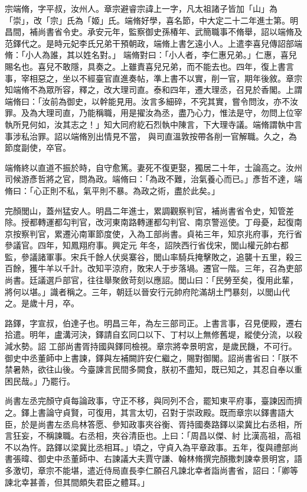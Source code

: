 \begin{pinyinscope}
 宗端脩，字平叔，汝州人。章宗避睿宗諱上一字，凡太祖諸子皆加「山」為「崇」，改「宗」氏為「姬」氏。端脩好學，喜名節，中大定二十二年進士第。明昌間，補尚書省令史。承安元年，監察御史孫椿年、武簡職事不脩舉，詔以端脩及范鐸代之。是時元妃李氏兄弟干預朝政，端脩上書乞遠小人。上遣李喜兒傳詔部端脩：「小人為誰，其以姓名對。」
 端脩對曰：「小人者，李仁惠兄弟。」仁惠，喜兒賜名也。喜兒不敢隱，具奏之。上雖責喜兒兄弟，而不能去也。四年，復上書言事，宰相惡之，坐以不經臺官直進奏帖，準上書不以實，削一官，期年後敘。章宗知端脩不為眾所容，釋之，改大理司直。泰和四年，遷大理丞，召見於香閣。上謂端脩曰：「汝前為御史，以幹能見用。汝言多細碎，不究其實，嘗令問汝，亦不汝罪。及為大理司直，乃能稱職，用是擢汝為丞，盡乃心力，惟法是守，勿問上位宰執所見何如，汝其志之！」知大同府紇石烈執中陳言，下大理寺議。端脩謂執中言事涉私治罪。詔以端脩別出情見不當，
 與司直溫敦按帶各削一官解職。久之，為節度副使，卒官。



 端脩終以直道不振於時，自守愈篤。妻死不復更娶，獨居二十年，士論高之。汝州司候游彥哲將之官，問為政。端脩曰：「為政不難，治氣養心而已。」彥哲不達，端脩曰：「心正則不私，氣平則不暴。為政之術，盡於此矣。」



 完顏閭山，蓋州猛安人。明昌二年進士，累調觀察判官，補尚書省令史，知管差除。授都轉運都勾判官，改河東南路轉運都勾判官、南京警巡使。丁母憂，起復南京按察判官，累遷沁南軍節度使，入為工部尚書。貞祐三年，知京兆府事，充行省參議官。四年，知鳳翔府事。興定元
 年冬，詔陜西行省伐宋，閭山權元帥右都監，參議諸軍事。宋兵千餘人伏吳寨谷，閭山率騎兵掩擊敗之，追襲十五里，殺三百餘，獲牛羊以千計。改知平涼府，敗宋人于步落堝。遷官一階。三年，召為吏部尚書。廷議選戶部官，往往舉聚斂苛刻以應詔。閭山曰：「民勞至矣，復用此輩，將何以堪。」識者稱之。三年，朝廷以晉安行元帥府陀滿胡土門暴刻，以閭山代之。是歲十月，卒。



 路鐸，字宣叔，伯達子也。明昌三年，為左三部司正。上書言事，召見便殿，遷右拾遣。明年，盧溝河決，鐸請自玄同口以下、丁村以上無修舊堤，縱使分流，以殺減水勢。詔
 工部尚書胥持國與鐸同檢視。章宗將幸景明宮，是歲民饑，不可行。御史中丞董師中上書諫，鐸與左補闕許安仁繼之，賜對御閣。詔尚書省曰：「朕不禁暑熱，欲往山後。今臺諫言民間多闕食，朕初不盡知，既已知之，其忍自奉以重困民哉。」乃罷行。



 尚書左丞完顏守貞每論政事，守正不移，與同列不合，罷知東平府事，臺諫因而擠之。鐸上書論守貞賢，可復用，其言太切，召對于崇政殿。既而章宗以鐸書語大臣，於是尚書左丞烏林答愿、參知政事夾谷衡、胥持國奏路鐸以梁冀比右丞相，所言狂妄，不稱諫職。右丞相，夾谷清臣也。上曰：「周昌以傑、紂
 比漢高祖，高祖不以為忤。路鐸以梁冀比丞相耳。」頃之，守貞入為平章政事。五年，復與禮部尚書張暐、御史中丞董師中、右諫議大夫賈守謙、翰林脩撰完顏撒刺諫幸景明宮，語多激切，章宗不能堪，遣近侍局直長李仁願召凡諫北幸者詣尚書省，詔曰：「卿等諫北幸甚善，但其間頗失君臣之體耳。」




\end{pinyinscope}
